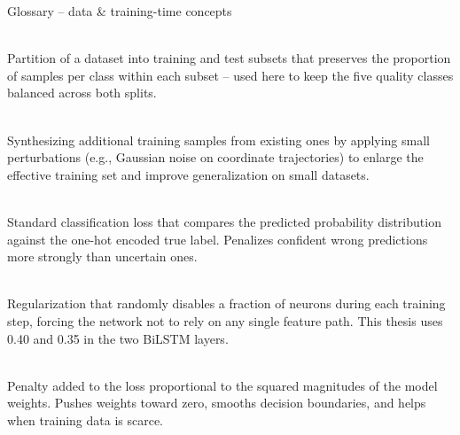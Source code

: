 \begin{frame}{Glossary -- data \& training-time concepts}
\footnotesize
\begin{description}\setlength{\itemsep}{8pt}\setlength{\parsep}{0pt}
\item[\textbf{Stratified split}]\hfill\\
Partition of a dataset into training and test subsets that preserves the proportion of samples per class within each subset -- used here to keep the five quality classes balanced across both splits.

\item[\textbf{Data augmentation}]\hfill\\
Synthesizing additional training samples from existing ones by applying small perturbations (e.g., Gaussian noise on coordinate trajectories) to enlarge the effective training set and improve generalization on small datasets.

\item[\textbf{Cross-entropy loss}]\hfill\\
Standard classification loss that compares the predicted probability distribution against the one-hot encoded true label. Penalizes confident wrong predictions more strongly than uncertain ones.

\item[\textbf{Dropout}]\hfill\\
Regularization that randomly disables a fraction of neurons during each training step, forcing the network not to rely on any single feature path. This thesis uses 0.40 and 0.35 in the two BiLSTM layers.

\item[\textbf{L2 regularization} (weight decay)]\hfill\\
Penalty added to the loss proportional to the squared magnitudes of the model weights. Pushes weights toward zero, smooths decision boundaries, and helps when training data is scarce.
\end{description}
\end{frame}

